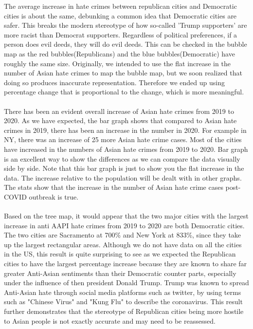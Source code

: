 \documentclass[fontsize=11pt]{article}
\begin{document}
\quad The average increase in hate crimes between republican cities and Democratic cities is about the same, debunking a common idea that Democratic cities are safer. This breaks the modern stereotype of how so-called 'Trump supporters' are more racist than Democrat supporters. Regardless of political preferences, if a person does evil deeds, they will do evil deeds. This can be checked in the bubble map as the red bubbles(Republicans) and the blue bubbles(Democratic) have roughly the same size. Originally, we intended to use the flat increase in the number of Asian hate crimes to map the bubble map, but we soon realized that doing so produces inaccurate representation. Therefore we ended up using percentage change that is proportional to the change, which is more meaningful.
\\\\
\quad There has been an evident overall increase of Asian hate crimes from 2019 to 2020. As we have expected, the bar graph shows that compared to Asian hate crimes in 2019, there has been an increase in the number in 2020. For example in NY, there was an increase of 25 more Asian hate crime cases. Most of the cities have increased in the numbers of Asian hate crimes from 2019 to 2020. Bar graph is an excellent way to show the differences as we can compare the data visually side by side. Note that this bar graph is just to show you the flat increase in the data. The increase relative to the population will be dealt with in other graphs. The stats show that the increase in the number of Asian hate crime cases post-COVID outbreak is true.
\\\\
\quad
Based on the tree map, it would appear that the two major cities with the largest increase in anti AAPI hate crimes from 2019 to 2020 are both Democratic cities. The two cities are Sacramento at 700\% and New York at 833\%, since they take up the largest rectangular areas. Although we do not have data on all the cities in the US, this result is quite surprising to see  as we expected the Republican cities to have the largest percentage increase because they are known to share far greater Anti-Asian sentiments than their Democratic counter parts, especially under the influence of then president Donald Trump. Trump was known to spread Anti-Asian hate through social media platforms such as twitter, by using terms such as "Chinese Virus" and "Kung Flu" to describe the coronavirus. This result further demonstrates that the stereotype of Republican cities being more hostile to Asian people is not exactly accurate and may need to be reassessed.
\end{document}
